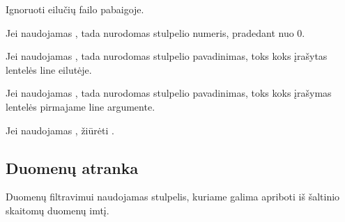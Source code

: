 \documentclass[letterpaper,10pt,lithuanian]{sphinxmanual}
\begin{document}
\begin{fulllineitems}
\begin{fulllineitems}
\end{fulllineitems}


\begin{fulllineitems}
\label{\detokenize{formules:func.tail}}
\pysigstartsignatures
{}
\pysigstopsignatures
\sphinxAtStartPar
Ignoruoti  eilučių failo pabaigoje.

\end{fulllineitems}


\end{fulllineitems}



\begin{fulllineitems}

\pysigstartsignatures
{}
\pysigstopsignatures
\sphinxAtStartPar
Jei naudojamas {\hyperref[\detokenize{formules:func.header}]{}}, tada nurodomas stulpelio
numeris, pradedant nuo 0.

\sphinxAtStartPar
Jei naudojamas {\hyperref[\detokenize{formules:func.header}]{}}, tada nurodomas stulpelio
pavadinimas, toks koks įrašytas lentelės line eilutėje.

\sphinxAtStartPar
Jei naudojamas {\hyperref[\detokenize{formules:func.header}]{}}, tada nurodomas stulpelio
pavadinimas, toks koks įrašymas lentelės pirmajame line argumente.

\end{fulllineitems}



\begin{fulllineitems}

\pysigstartsignatures
{}
\pysigstopsignatures
\sphinxAtStartPar
Jei naudojamas , žiūrėti {\hyperref[\detokenize{formules:kompleksines-strukturos}]{}}.

\end{fulllineitems}



\subsection{Duomenų atranka}
\label{\detokenize{formules:duomenu-atranka}}\label{\detokenize{formules:id6}}
\sphinxAtStartPar
Duomenų filtravimui naudojamas {\hyperref[\detokenize{dimensijos:module-model.prepare}]{}} stulpelis, kuriame galima
apriboti iš šaltinio skaitomų duomenų imtį.
\end{document}
